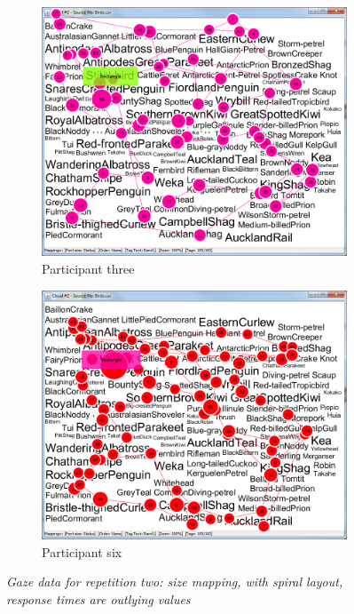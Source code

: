 \begin{figure}[!htb]
\begin{subfigure}{.5\textwidth}
	\centering
	\includegraphics[scale=0.25]{t2sizespiralp3.png}
  	\caption{Participant three}
\end{subfigure}
\begin{subfigure}{.5\textwidth}
 	 \centering
 	 \includegraphics[scale=0.25]{t2sizespiralp6.png}
 	 \caption{Participant six}
\end{subfigure}
\caption{\textit{Gaze data for repetition two: size mapping, with spiral layout, response times are outlying values}}
\label{fig:rep2}
\end{figure}

